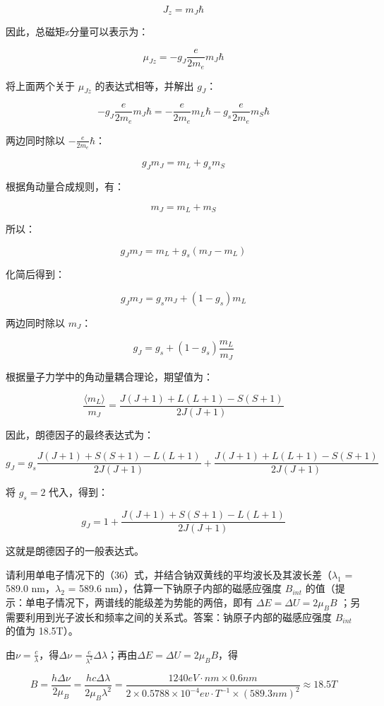 \documentclass[dvipsnames, svgnames,a4paper,11pt]{article}
\begin{document}
		\[
		J_z = m_J \hbar
		\]

	因此，总磁矩z分量可以表示为：

		\[
		\mu_{Jz} = -g_J \frac{e}{2m_e} m_J \hbar
		\]

	将上面两个关于 \(\mu_{Jz}\) 的表达式相等，并解出 \( g_J \)：

		\[
		-g_J \frac{e}{2m_e} m_J \hbar = -\frac{e}{2m_e} m_L \hbar - g_s \frac{e}{2m_e} m_S \hbar
		\]

	两边同时除以 \( -\frac{e}{2m_e} \hbar \)：

		\[
		g_J m_J = m_L + g_s m_S
		\]

	根据角动量合成规则，有：

		\[
		m_J = m_L + m_S
		\]

	所以：

		\[
		g_J m_J = m_L + g_s (m_J - m_L)
		\]

	化简后得到：

		\[
		g_J m_J = g_s m_J + (1 - g_s) m_L
		\]

	两边同时除以 \( m_J \)：

		\[
		g_J = g_s + \left(1 - g_s\right) \frac{m_L}{m_J}
		\]


	根据量子力学中的角动量耦合理论，期望值为：

		\[
		\frac{\langle m_L \rangle}{m_J} = \frac{J(J+1) + L(L+1) - S(S+1)}{2J(J+1)}
		\]

	因此，朗德因子的最终表达式为：

		\[
		g_J = g_s \frac{J(J+1) + S(S+1) - L(L+1)}{2J(J+1)} + \frac{J(J+1) + L(L+1) - S(S+1)}{2J(J+1)}
		\]

	将 \( g_s = 2 \) 代入，得到：

		\[
		g_J = 1 + \frac{J(J+1) + S(S+1) - L(L+1)}{2J(J+1)}
		\]

	这就是朗德因子的一般表达式。


\begin{question}
	请利用单电子情况下的（36）式，并结合钠双黄线的平均波长及其波长差（$\lambda_1$ = 589.0 nm，$\lambda_2$  = 589.6 nm），估算一下钠原子内部的磁感应强度 $B_{int}$ 的值（提示：单电子情况下，两谱线的能级差为势能的两倍，即有 $\Delta E = \Delta U =2 \mu_B B$ ；另需要利用到光子波长和频率之间的关系式。答案：钠原子内部的磁感应强度 $B_{int}$ 的值为 18.5T）。
\end{question}

	由$\nu = \frac{c}{\lambda}$，得$\Delta \nu = \frac{c}{\lambda^2}\Delta \lambda$；再由$\Delta E = \Delta U =2 \mu_B B$，得

	\[
		B = \frac{h \Delta \nu}{2 \mu_B} = \frac{h c \Delta \lambda}{2 \mu_B \lambda^2} = \frac{1240eV \cdot nm \times 0.6nm}{2\times 0.5788\times 10^{-4}ev\cdot T^{-1} \times (589.3nm)^2} \approx 18.5T
	\]
\end{document}
